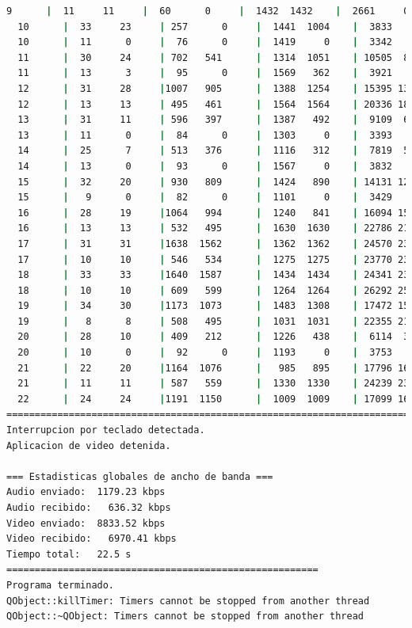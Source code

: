 \begin{lstlisting}[language=bash,basicstyle=\ttfamily\scriptsize]
   9      |  11     11     |  60      0     |  1432  1432    |  2661     0    |  35     71
  10      |  33     23     | 257      0     |  1441  1004    |  3833     0    |  41     72
  10      |  11      0     |  76      0     |  1419     0    |  3342     0    |  47     72
  11      |  30     24     | 702   541      |  1314  1051    | 10505  8096    |  45     72
  11      |  13      3     |  95      0     |  1569   362    |  3921     0    |  44     70
  12      |  31     28     |1007   905      |  1388  1254    | 15395 13840    |  45     70
  12      |  13     13     | 495   461      |  1564  1564    | 20336 18938    |  44     70
  13      |  31     11     | 596   397      |  1387   492    |  9109  6067    |  46     67
  13      |  11      0     |  84      0     |  1303     0    |  3393     0    |  54     66
  14      |  25      7     | 513   376      |  1116   312    |  7819  5728    |  29     63
  14      |  13      0     |  93      0     |  1567     0    |  3832     0    |  51     65
  15      |  32     20     | 930   809      |  1424   890    | 14131 12293    |  39     67
  15      |   9      0     |  82      0     |  1101     0    |  3429     0    |  44     66
  16      |  28     19     |1064   994      |  1240   841    | 16094 15037    |  35     70
  16      |  13     13     | 532   495      |  1630  1630    | 22786 21199    |  45     71
  17      |  31     31     |1638  1562      |  1362  1362    | 24570 23429    |  42     71
  17      |  10     10     | 546   534      |  1275  1275    | 23770 23255    |  23     71
  18      |  33     33     |1640  1587      |  1434  1434    | 24341 23550    |  41     73
  18      |  10     10     | 609   599      |  1264  1264    | 26292 25868    |  34     73
  19      |  34     30     |1173  1073      |  1483  1308    | 17472 15978    |  30     72
  19      |   8      8     | 508   495      |  1031  1031    | 22355 21783    |  27     72
  20      |  28     10     | 409   212      |  1226   438    |  6114  3171    |  46     68
  20      |  10      0     |  92      0     |  1193     0    |  3753     0    |  54     68
  21      |  22     20     |1164  1076      |   985   895    | 17796 16452    |  35     70
  21      |  11     11     | 587   559      |  1330  1330    | 24239 23074    |  29     69
  22      |  24     24     |1191  1150      |  1009  1009    | 17099 16512    |  25     72
============================================================================================
Interrupcion por teclado detectada.
Aplicacion de video detenida.

=== Estadisticas globales de ancho de banda ===
Audio enviado:	1179.23 kbps
Audio recibido:   636.32 kbps
Video enviado:	8833.52 kbps
Video recibido:   6970.41 kbps
Tiempo total: 	22.5 s
=======================================================
Programa terminado.
QObject::killTimer: Timers cannot be stopped from another thread
QObject::~QObject: Timers cannot be stopped from another thread
\end{lstlisting}
\vspace{\baselineskip}

